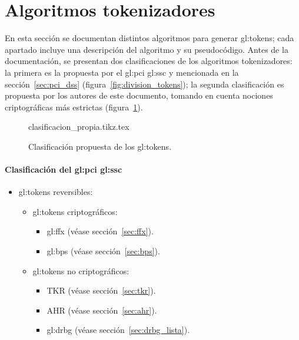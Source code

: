 %
%

\section{Algoritmos tokenizadores}
\label{sec:algoritmos}

En esta sección se documentan distintos algoritmos para generar
\glspl{gl:token}; cada apartado incluye una descripción del
algoritmo y su pseudocódigo. Antes de la documentación, se presentan
dos clasificaciones de los algoritmos tokenizadores: la primera es la propuesta
por el \gls{gl:pci} \gls{gl:ssc} y mencionada en la sección~\ref{sec:pci_dss}
(figura~\ref{fig:division_tokens}); la segunda clasificación es propuesta por
los autores de este documento, tomando en cuenta nociones criptográficas más
estrictas (figura~\ref{fig:division_propia}).

\begin{figure}
  \begin{center}
    {clasificacion_propia.tikz.tex}
    \caption{Clasificación propuesta de los \glspl{gl:token}.}
    \label{fig:division_propia}
  \end{center}
\end{figure}

\paragraph{Clasificación del %
  \texorpdfstring{\acrshort{gl:pci}}{PCI} %
  \texorpdfstring{\acrshort{gl:ssc}}{SSC}}

\begin{itemize}
  \item \Glspl{gl:token} reversibles:
    \begin{itemize}
      \item \Glspl{gl:token} criptográficos:
        \begin{itemize}
          \item \Gls{gl:ffx} (véase sección~\ref{sec:ffx}).
          \item \Gls{gl:bps} (véase sección~\ref{sec:bps}).
        \end{itemize}
      \item \Glspl{gl:token} no criptográficos:
        \begin{itemize}
          \item TKR (véase sección~\ref{sec:tkr}).
          \item AHR (véase sección~\ref{sec:ahr}).
          \item \Gls{gl:drbg} (véase sección~\ref{sec:drbg_lista}).
        \end{itemize}
    \end{itemize}
\end{itemize}

